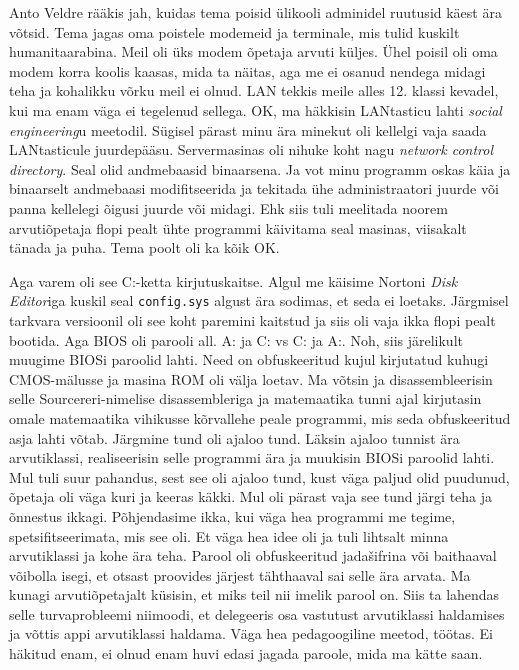 Anto Veldre rääkis jah, kuidas tema poisid
ülikooli adminidel ruutusid käest ära võtsid. Tema jagas oma poistele
modemeid ja terminale, mis tulid kuskilt humanitaarabina. Meil oli üks modem
õpetaja arvuti küljes. Ühel poisil oli oma modem korra koolis kaasas, mida ta
näitas, aga me ei osanud nendega midagi teha ja kohalikku võrku meil ei olnud.
LAN tekkis meile alles 12.
klassi kevadel, kui ma enam väga ei tegelenud sellega. OK, ma häkkisin
LANtasticu
lahti \emph{social engineering}u meetodil. Sügisel pärast minu ära minekut oli
kellelgi vaja saada LANtasticule juurdepääsu. Servermasinas oli nihuke koht
nagu \emph{network control directory}. Seal olid andmebaasid binaarsena. Ja vot
minu programm oskas käia ja binaarselt andmebaasi modifitseerida ja tekitada
ühe administraatori juurde või panna kellelegi õigusi juurde või midagi. Ehk
siis tuli meelitada noorem arvutiõpetaja flopi pealt ühte programmi käivitama
seal masinas, viisakalt tänada ja puha. Tema poolt oli ka kõik OK.

Aga varem oli see C:-ketta kirjutuskaitse. Algul me käisime Nortoni \emph{Disk
Editor}iga kuskil seal \verb|config.sys| algust ära sodimas, et seda ei
loetaks. Järgmisel tarkvara versioonil oli see koht paremini kaitstud ja siis
oli vaja ikka flopi pealt bootida. Aga BIOS oli parooli all. A: ja C: vs C: ja
A:. Noh, siis järelikult muugime BIOSi paroolid lahti. Need on obfuskeeritud
kujul kirjutatud kuhugi CMOS-mälusse ja masina ROM oli välja loetav. Ma võtsin
ja disassembleerisin selle Sourcereri-nimelise disassembleriga ja matemaatika
tunni ajal kirjutasin omale matemaatika vihikusse kõrvallehe peale programmi,
mis seda obfuskeeritud asja lahti võtab. Järgmine tund oli ajaloo tund. Läksin
ajaloo tunnist ära arvutiklassi, realiseerisin selle programmi ära ja muukisin
BIOSi paroolid lahti. Mul tuli suur pahandus, sest see oli ajaloo tund, kust
väga paljud olid puudunud, õpetaja oli väga kuri ja keeras käkki. Mul oli
pärast vaja see tund järgi teha ja õnnestus ikkagi. Põhjendasime ikka, kui väga
hea programmi me tegime, spetsifitseerimata, mis see oli. Et väga hea idee oli
ja tuli lihtsalt minna arvutiklassi ja kohe ära teha. Parool oli obfuskeeritud
jadašifrina või baithaaval võibolla isegi, et otsast proovides järjest
tähthaaval sai selle ära arvata. Ma kunagi arvutiõpetajalt küsisin, et miks
teil nii imelik parool on. Siis ta lahendas selle turvaprobleemi niimoodi, et
delegeeris osa vastutust arvutiklassi haldamises ja võttis appi arvutiklassi
haldama. Väga hea pedagoogiline meetod, töötas. Ei häkitud enam, ei olnud enam
huvi edasi jagada paroole, mida ma kätte saan.

